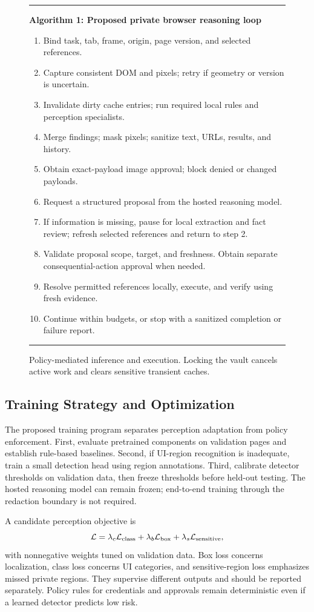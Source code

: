 \documentclass[conference]{IEEEtran}
\begin{document}
\begin{figure}[t]
\small
\hrule\vspace{4pt}
\textbf{Algorithm 1: Proposed private browser reasoning loop}
\begin{enumerate}
\item Bind task, tab, frame, origin, page version, and selected references.
\item Capture consistent DOM and pixels; retry if geometry or version is uncertain.
\item Invalidate dirty cache entries; run required local rules and perception specialists.
\item Merge findings; mask pixels; sanitize text, URLs, results, and history.
\item Obtain exact-payload image approval; block denied or changed payloads.
\item Request a structured proposal from the hosted reasoning model.
\item If information is missing, pause for local extraction and fact review; refresh selected references and return to step 2.
\item Validate proposal scope, target, and freshness. Obtain separate consequential-action approval when needed.
\item Resolve permitted references locally, execute, and verify using fresh evidence.
\item Continue within budgets, or stop with a sanitized completion or failure report.
\end{enumerate}
\hrule
\caption{Policy-mediated inference and execution. Locking the vault cancels active work and clears sensitive transient caches.}
\label{fig:algorithm}
\end{figure}

\subsection{Training Strategy and Optimization}
The proposed training program separates perception adaptation from policy enforcement. First, evaluate pretrained components on validation pages and establish rule-based baselines. Second, if UI-region recognition is inadequate, train a small detection head using region annotations. Third, calibrate detector thresholds on validation data, then freeze thresholds before held-out testing. The hosted reasoning model can remain frozen; end-to-end training through the redaction boundary is not required.

A candidate perception objective is
\begin{equation}
 \mathcal{L}=\lambda_c\mathcal{L}_{\rm class}
 +\lambda_b\mathcal{L}_{\rm box}+\lambda_s\mathcal{L}_{\rm sensitive},
\end{equation}
with nonnegative weights tuned on validation data. Box loss concerns localization, class loss concerns UI categories, and sensitive-region loss emphasizes missed private regions. They supervise different outputs and should be reported separately. Policy rules for credentials and approvals remain deterministic even if a learned detector predicts low risk.
\end{document}
